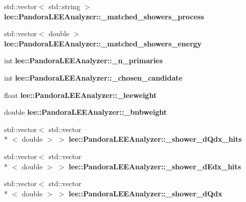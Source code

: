 \begin{DoxyCompactItemize}
\item 
\hypertarget{group__lee_ga68fdfb9878716c7d99651a98e294818d}{std\-::vector$<$ std\-::string $>$ {\bfseries lee\-::\-Pandora\-L\-E\-E\-Analyzer\-::\-\_\-matched\-\_\-showers\-\_\-process}}\label{group__lee_ga68fdfb9878716c7d99651a98e294818d}

\item 
\hypertarget{group__lee_ga8c616d054941206de6a91e7859ac4209}{std\-::vector$<$ double $>$ {\bfseries lee\-::\-Pandora\-L\-E\-E\-Analyzer\-::\-\_\-matched\-\_\-showers\-\_\-energy}}\label{group__lee_ga8c616d054941206de6a91e7859ac4209}

\item 
\hypertarget{group__lee_ga9cb9605f2fe0af2464f936651659ad91}{int {\bfseries lee\-::\-Pandora\-L\-E\-E\-Analyzer\-::\-\_\-n\-\_\-primaries}}\label{group__lee_ga9cb9605f2fe0af2464f936651659ad91}

\item 
\hypertarget{group__lee_ga258cdf1c3fb847abc6f3aad95f8471d0}{int {\bfseries lee\-::\-Pandora\-L\-E\-E\-Analyzer\-::\-\_\-chosen\-\_\-candidate}}\label{group__lee_ga258cdf1c3fb847abc6f3aad95f8471d0}

\item 
\hypertarget{group__lee_gaeba6b9ecae9a1616394a17189dfe4808}{float {\bfseries lee\-::\-Pandora\-L\-E\-E\-Analyzer\-::\-\_\-leeweight}}\label{group__lee_gaeba6b9ecae9a1616394a17189dfe4808}

\item 
\hypertarget{group__lee_ga9450f1c2fbd4efa3927094f9953c5041}{double {\bfseries lee\-::\-Pandora\-L\-E\-E\-Analyzer\-::\-\_\-bnbweight}}\label{group__lee_ga9450f1c2fbd4efa3927094f9953c5041}

\item 
\hypertarget{group__lee_gaa6b9f1a06dcc4c9b5e7ad66b2a5f3995}{std\-::vector$<$ std\-::vector\\*
$<$ double $>$ $>$ {\bfseries lee\-::\-Pandora\-L\-E\-E\-Analyzer\-::\-\_\-shower\-\_\-d\-Qdx\-\_\-hits}}\label{group__lee_gaa6b9f1a06dcc4c9b5e7ad66b2a5f3995}

\item 
\hypertarget{group__lee_ga8dc5bf5791d750d7481aa6a4051433d3}{std\-::vector$<$ std\-::vector\\*
$<$ double $>$ $>$ {\bfseries lee\-::\-Pandora\-L\-E\-E\-Analyzer\-::\-\_\-shower\-\_\-d\-Edx\-\_\-hits}}\label{group__lee_ga8dc5bf5791d750d7481aa6a4051433d3}

\item 
\hypertarget{group__lee_gaec600c2d05138143cbef4f23c44d92cf}{std\-::vector$<$ std\-::vector\\*
$<$ double $>$ $>$ {\bfseries lee\-::\-Pandora\-L\-E\-E\-Analyzer\-::\-\_\-shower\-\_\-d\-Qdx}}\label{group__lee_gaec600c2d05138143cbef4f23c44d92cf}


\end{DoxyCompactItemize}
